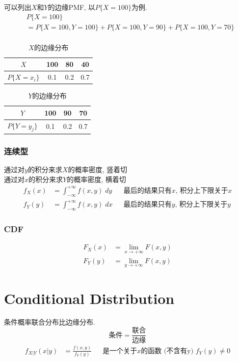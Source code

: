 \documentclass[a4paper]{report}
\begin{document}
可以列出$X$和$Y$的边缘PMF, 以$P \{X=100\}$为例. 
\begin{align*}
  &P \{X=100\}\\
  &=P \{X=100,Y=100\}+P \{X=100,Y=90\}+P \{X=100,Y=70\}\\
\end{align*}
\begin{table}[htbp]
  \centering
  \caption{$X$的边缘分布}
    \begin{tabular}{c|ccc}
    $X$     & 100   & 80    & 40 \\
    \hline
    $P \{X=x_i\}$     & 0.1   & 0.2   & 0.7 \\
    \end{tabular}%
\end{table}%

\begin{table}[htbp]
  \centering
  \caption{$Y$的边缘分布}
    \begin{tabular}{c|ccc}
    $Y$     & 100   & 90    & 70 \\
    \hline
    $P \{Y=y_j\}$     & 0.1   & 0.2   & 0.7 \\
    \end{tabular}%
\end{table}%

\subsubsection{连续型}
通过对$y$的积分来求$X$的概率密度, 竖着切\\
通过对$x$的积分来求$Y$的概率密度, 横着切
\begin{align*}
  f_X(x)&= \int_{-\infty}^{+\infty} f(x,y)\; dy&&\text{最后的结果只有$x$, 积分上下限关于$x$}\\
  f_Y(y)&= \int_{-\infty}^{+\infty} f(x,y)\; dx&&\text{最后的结果只有$y$, 积分上下限关于$y$}
\end{align*}

\subsubsection{CDF}
\begin{align*}
  F_X(x)&=\lim_{x\rightarrow +\infty} F(x,y)\\
  F_Y(y)&=\lim_{y\rightarrow +\infty} F(x,y)
\end{align*}
\section{Conditional Distribution}
条件概率联合分布比边缘分布. 
$$\text{条件}=\frac{\text{联合}}{\text{边缘}}$$
\begin{align*}
  f_{X|Y}(x|y)&=\frac{f(x,y)}{f_Y(y)}&&\text{是一个关于$x$的函数 (不含有y) $f_Y(y)\neq 0$}
\end{align*}
\end{document}
